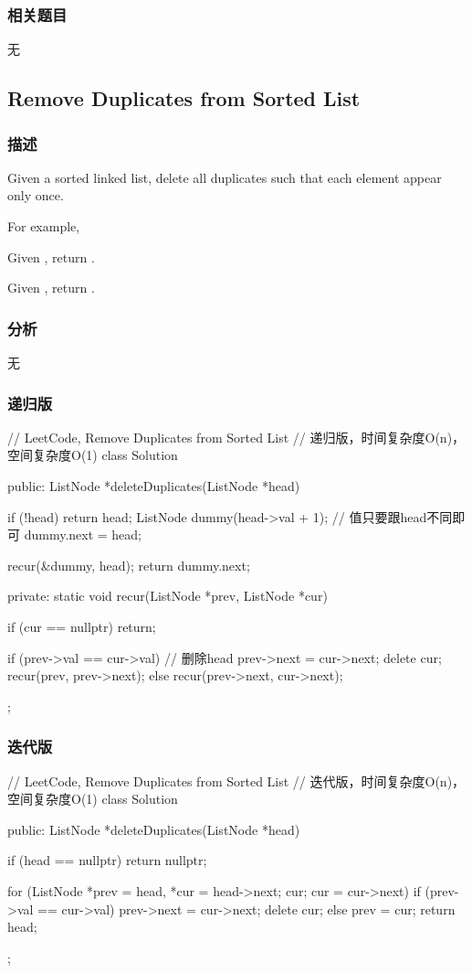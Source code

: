 \subsubsection{相关题目}

\begindot
\item 无
\myenddot


\subsection{Remove Duplicates from Sorted List}
\label{sec:remove-duplicates-from-sorted-list}


\subsubsection{描述}
Given a sorted linked list, delete all duplicates such that each element appear only once.

For example,

Given , return .

Given , return .


\subsubsection{分析}
无


\subsubsection{递归版}
\begin{Code}
// LeetCode, Remove Duplicates from Sorted List
// 递归版，时间复杂度O(n)，空间复杂度O(1)
class Solution {
public:
    ListNode *deleteDuplicates(ListNode *head) {
        if (!head) return head;
        ListNode dummy(head->val + 1); // 值只要跟head不同即可
        dummy.next = head;

        recur(&dummy, head);
        return dummy.next;
    }
private:
    static void recur(ListNode *prev, ListNode *cur) {
        if (cur == nullptr) return;

        if (prev->val == cur->val) { // 删除head
            prev->next = cur->next;
            delete cur;
            recur(prev, prev->next);
        } else {
            recur(prev->next, cur->next);
        }
    }
};
\end{Code}


\subsubsection{迭代版}
\begin{Code}
// LeetCode, Remove Duplicates from Sorted List
// 迭代版，时间复杂度O(n)，空间复杂度O(1)
class Solution {
public:
    ListNode *deleteDuplicates(ListNode *head) {
        if (head == nullptr) return nullptr;

        for (ListNode *prev = head, *cur = head->next; cur; cur = cur->next) {
            if (prev->val == cur->val) {
                prev->next = cur->next;
                delete cur;
            } else {
                prev = cur;
            }
        }
        return head;
    }
};
\end{Code}


